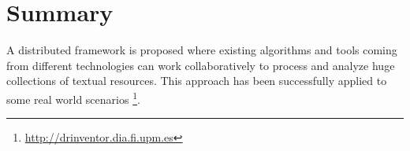 
 





\section{Summary}

A distributed framework is proposed where existing algorithms and tools coming from different technologies can work collaboratively to process and analyze huge collections of textual resources. This approach has been successfully applied to some real world scenarios \footnote{\url{http://drinventor.dia.fi.upm.es}}.
 
